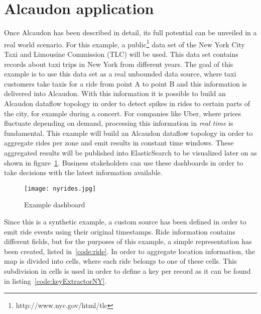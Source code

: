 \section{Alcaudon application}

Once Alcaudon has been described in detail, its full potential can be unveiled
in a real world scenario. For this example, a
public\footnote{http://www.nyc.gov/html/tlc} data set of the New York City Taxi
and Limousine Commission (TLC) will be used. This data set contains records
about taxi trips in New York from different years. The goal of this example is
to use this data set as a real unbounded data source, where taxi customers take
taxis for a ride from point A to point B and this information is delivered into
Alcaudon. With this information it is possible to build an Alcaudon dataflow
topology in order to detect spikes in rides to certain parts of the city, for
example during a concert. For companies like Uber, where prices fluctuate
depending on demand, processing this information in \textit{real time} is
fundamental. This example will build an Alcaudon dataflow topology in order to
aggregate rides per zone and emit results in constant time windows. These
aggregated results will be published into ElasticSearch to be visualized later
on as shown in figure~\ref{fig:rides}. Business stakeholders can use these
dashboards in order to take decisions with the latest information available.

\begin{figure}[!h]
\begin{center}
\texttt{[image: nyrides.jpg]}
\caption{Example dashboard}
\label{fig:rides}
\end{center}
\end{figure}

Since this is a synthetic example, a custom source has been defined in order to
emit ride events using their original timestamps. Ride information contains
different fields, but for the purposes of this example, a simple representation
has been created, listed in~\ref{code:ride}. In order to aggregate location
information, the map is divided into cells, where each ride belongs to one of
these cells. This subdivision in cells is used in order to define a key per
record as it can be found in listing~\ref{code:keyExtractorNY}.

